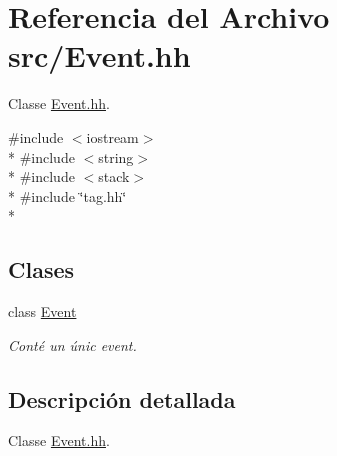 \hypertarget{_event_8hh}{}\section{Referencia del Archivo src/\+Event.hh}
\label{_event_8hh}


Classe \hyperlink{_event_8hh}{Event.\+hh}.  


{\ttfamily \#include $<$iostream$>$}\\*
{\ttfamily \#include $<$string$>$}\\*
{\ttfamily \#include $<$stack$>$}\\*
{\ttfamily \#include \char`\"{}tag.\+hh\char`\"{}}\\*
\subsection*{Clases}
\begin{DoxyCompactItemize}
\item 
class \hyperlink{class_event}{Event}
\begin{DoxyCompactList}\small\item\em Conté un únic event. \end{DoxyCompactList}\end{DoxyCompactItemize}


\subsection{Descripción detallada}
Classe \hyperlink{_event_8hh}{Event.\+hh}. 

